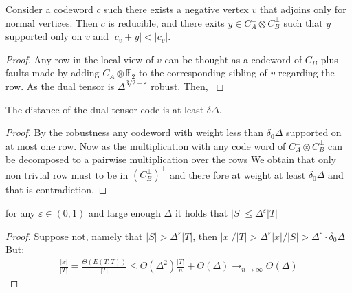\begin{claim}
  Consider a codeword $c$ such there exists a negative vertex $v$ that adjoins only for normal vertices. Then $c$ is reducible, and there exits $y \in C_{A}^{\perp}\otimes C_{B}^{\perp}$ such that $y$ supported only on $v$ and $ | c_{v} + y | < |c_{v}| $.       
\end{claim}

\begin{proof}
  Any row in the local view of $v$ can be thought as a codeword of $C_{B}$ plus faults made by adding $C_{A}\otimes \mathbb{F}_{2}$ to the corresponding sibling of $v$ regarding the row. As the dual tensor is $\Delta^{3/2+\varepsilon}$ robust. Then, \cite{kalachev2022twosided}       
\end{proof}


\begin{claim}
  The distance of the dual tensor code is at least $\delta\Delta$.
\end{claim}
\begin{proof}
  By the robustness any codeword with weight less than $\delta_{0}\Delta$ supported on at most one row. Now as the multiplication with any code word of $C_{A}^\perp \otimes C_{B}^\perp$ can be decomposed to a pairwise multiplication over the rows We obtain that only non trivial row must to be in $ \left( C_{B}^{\perp} \right)^{\perp}$ and there fore at weight at least $\delta_{0}\Delta$ and that is contradiction.  
\end{proof}

\begin{claim}
  \label{claim:epss}
  for any $\varepsilon \in \left( 0,1 \right)$ and large enough $\Delta$  it holds that $ |S| \le \Delta^{\varepsilon}|T| $ 
\end{claim}
\begin{proof}
  Suppose not, namely that $|S| > \Delta^{\varepsilon}|T|$, then $|x|/|T| > \Delta^{\varepsilon}|x|/|S| > \Delta^{\varepsilon} \cdot \delta_{0}\Delta $ But:  
\begin{equation*}
  \begin{split}
    \frac{|x|}{|T|} = \frac{\Theta \left(E(T,T) \right)}{|T|} \le \Theta(\Delta^{2})\frac{|T|}{n}  + \Theta(\Delta)  \rightarrow_{n\rightarrow \infty} \Theta(\Delta)
  \end{split}
\end{equation*}
\end{proof}

